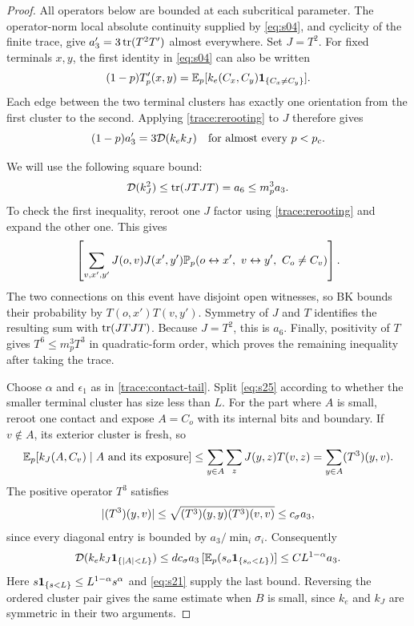 \begin{proof}
All operators below are bounded at each subcritical parameter.
The operator-norm local absolute continuity supplied by
\eqref{eq:s04}, and cyclicity of the finite trace, give
$a_3'=3\operatorname{tr}(T^2T')$ almost everywhere.  Set $J=T^2$.
For fixed terminals $x,y$, the first identity in \eqref{eq:s04}
can also be written
\[
 (1-p)T'_p(x,y)
   =\mathbb E_p[k_e(C_x,C_y)\mathbf 1_{\{C_x\ne C_y\}}].
\]
Each edge between the two terminal clusters has exactly one
orientation from the first cluster to the second.  Applying
\eqref{trace:rerooting} to $J$ therefore gives
\begin{equation}
 (1-p)a_3'=3\mathcal D(k_e k_J)
 \quad\text{for almost every }p<{p_c}.
 \label{eq:s25}
\end{equation}

We will use the following square bound:
\begin{equation}
 \mathcal D(k_J^2)\le\operatorname{tr}(JTJT)=a_6\le m_p^3a_3.
 \label{trace:kernel-square}
\end{equation}
To check the first inequality, reroot one $J$ factor using
\eqref{trace:rerooting} and expand the other one.  This gives
\[
 \left[\sum_{v,x',y'}J(o,v)J(x',y')
   \mathbb P_p(o\leftrightarrow x',\ v\leftrightarrow y',\
                                      C_o\ne C_v)\right].
\]
The two connections on this event have disjoint open witnesses,
so BK bounds their probability by $T(o,x')T(v,y')$.
Symmetry of $J$ and $T$ identifies the resulting sum with
$\operatorname{tr}(JTJT)$.  Because $J=T^2$, this is $a_6$.  Finally, positivity
of $T$ gives $T^6\le m_p^3T^3$ in quadratic-form order, which
proves the remaining inequality after taking the trace.

Choose $\alpha$ and $\epsilon_1$ as in
\cref{trace:contact-tail}.  Split \eqref{eq:s25} according to
whether the smaller terminal cluster has size less than $L$.
For the part where $A$ is small, reroot one contact and expose
$A=C_o$ with its internal bits and boundary.  If $v\notin A$,
its exterior cluster is fresh, so
\[
 \mathbb E_p[k_J(A,C_v)\mid A\text{ and its exposure}]
 \le\sum_{y\in A}\sum_z J(y,z)T(v,z)
 =\sum_{y\in A}(T^3)(y,v).
\]
The positive operator $T^3$ satisfies
\[
 \lvert(T^3)(y,v)\rvert
 \le\sqrt{(T^3)(y,y)(T^3)(v,v)}\le c_\sigma a_3,
\]
since every diagonal entry is bounded by $a_3/\min_i\sigma_i$.
Consequently
\[
 \mathcal D(k_e k_J\mathbf 1_{\{\lvert A\rvert<L\}})
 \le d c_\sigma a_3\,[\mathbb E_p(s_o\mathbf 1_{\{s_o<L\}})]
 \le C L^{1-\alpha}a_3.
\]
Here $s\mathbf 1_{\{s<L\}}\le L^{1-\alpha}s^\alpha$ and
\eqref{eq:s21} supply the last bound.  Reversing the ordered
cluster pair gives the same estimate when $B$ is small, since
$k_e$ and $k_J$ are symmetric in their two arguments.


\end{proof}
